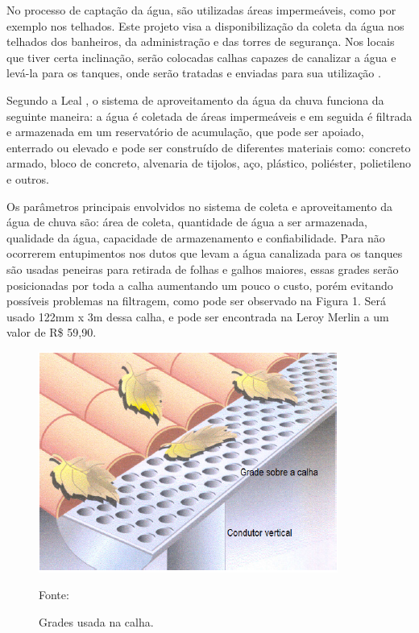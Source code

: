No processo de captação da água, são utilizadas áreas impermeáveis, como por exemplo nos telhados. Este projeto visa a disponibilização da coleta da água nos telhados dos banheiros, da administração e das torres de segurança. Nos locais que tiver certa inclinação, serão colocadas calhas capazes de canalizar a água e levá-la para os tanques, onde serão tratadas e enviadas para sua utilização \cite{MAY}.

Segundo a Leal \cite{LEAL} , o sistema de aproveitamento da água da chuva funciona da seguinte maneira: a água é coletada de áreas impermeáveis e em seguida é filtrada e armazenada em um reservatório de acumulação, que pode ser apoiado, enterrado ou elevado e pode ser construído de diferentes materiais como: concreto armado, bloco de concreto, alvenaria de tijolos, aço, plástico, poliéster, polietileno e outros. 

Os parâmetros principais envolvidos no sistema de coleta e aproveitamento da água de chuva são: área de coleta, quantidade de água a ser armazenada, qualidade da água, capacidade de armazenamento e confiabilidade. 
Para não ocorrerem entupimentos nos dutos que levam a água canalizada para os tanques são usadas peneiras para retirada de folhas e galhos maiores, essas grades serão posicionadas por toda a calha aumentando um pouco o custo, porém evitando possíveis problemas na filtragem, como pode ser observado na Figura 1. Será usado 122mm x 3m dessa calha, e pode ser encontrada na  Leroy Merlin a um valor de R\$ 59,90.

\begin{figure}[H]
	 \centering
	\label{Grades usada na calha.}
	 \includegraphics[scale=0.6]{captacao/5.png}
	 \caption{Grades usada na calha.}
	 \small{Fonte: \cite{WATERFALL}}
\end{figure}

